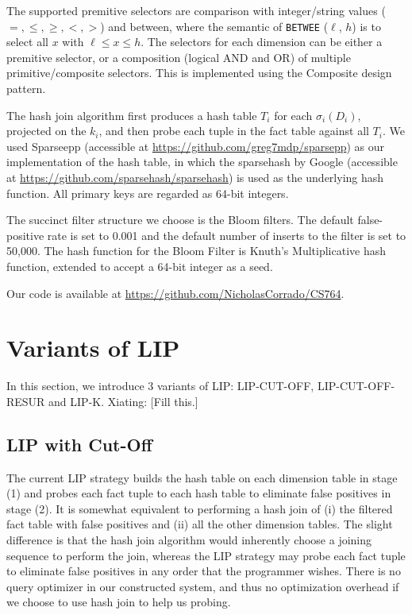 \documentclass[10pt]{article}
\newcommand{\xiating}[1]{{\color{blue} Xiating: [{#1}]}}
\begin{document}
The supported premitive selectors are comparison with integer/string values ($=, \leq, \geq, <, >$) and between, where the semantic of \texttt{BETWEE} ($\ell$, $h$) is to select all $x$ with $\ell \leq x \leq h$. The selectors for each dimension can be either a premitive selector, or a composition (logical AND and OR) of multiple primitive/composite selectors. This is implemented using the Composite design pattern.


The hash join algorithm first produces a hash table $T_i$ for each $\sigma_i(D_i)$, projected on the $k_i$, and then probe each tuple in the fact table against all $T_i$. We used Sparseepp (accessible at \url{https://github.com/greg7mdp/sparsepp}) as our implementation of the hash table, in which the sparsehash by Google (accessible at \url{https://github.com/sparsehash/sparsehash}) is used as the underlying hash function. All primary keys are regarded as 64-bit integers.

The succinct filter structure we choose is the Bloom filters. The default false-positive rate is set to 0.001 and the default number of inserts to the filter is set to 50,000. The hash function for the Bloom Filter is Knuth's Multiplicative hash function, extended to accept a 64-bit integer as a seed. 


Our code is available at \url{https://github.com/NicholasCorrado/CS764}.


\section{Variants of LIP}

In this section, we introduce 3 variants of LIP: LIP-CUT-OFF, LIP-CUT-OFF-RESUR and LIP-K. \xiating{Fill this.}


\subsection{LIP with Cut-Off}
The current LIP strategy builds the hash table on each dimension table in stage (1) and probes each fact tuple to each hash table to eliminate false positives in stage (2). It is somewhat equivalent to performing a hash join of (i) the filtered fact table with false positives and (ii) all the other dimension tables. The slight difference is that the hash join algorithm would inherently choose a joining sequence to perform the join, whereas the LIP strategy may probe each fact tuple to eliminate false positives in any order that the programmer wishes. There is no query optimizer in our constructed system, and thus no optimization overhead if we choose to use hash join to help us probing.
\end{document}
